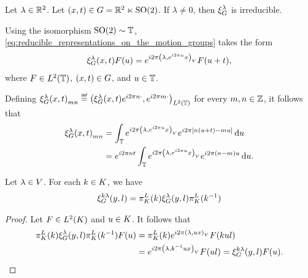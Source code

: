 \begin{example}
    Let $\lambda \in \mathbb{R}^2$.
    Let $(x, t) \in G = \mathbb{R}^2 \ltimes {\mathrm{SO} (2)}$.
    If $\lambda \neq 0$, then $\xi^{\lambda}_{G}$ is irreducible.

    Using the isomorphism ${\mathrm{SO} (2)} \sim \mathbb{T}$,
    \eqref{eq:reducible_representations_on_the_motion_groups} takes the form
    \begin{align*}
        \xi^{\lambda}_{G}(x, t) F(u)
        = e^{i 2 \pi {\left(\lambda, e^{i2 \pi u} x\right)_{V}}} F(u + t),
    \end{align*}
    where $F \in {L^{2} (\mathbb{T})}$, $(x, t) \in G$, and $u \in \mathbb{T}$.

    Defining ${\Rep\lambda(x, t)}_{m n} \defeq \ip[\Lebesgue{2}\T]{\Rep\lambda(x, t) \e^{\i \turn n \dummy}}{\e^{\i \turn m \dummy}}$ for every $m, n \in \mathbb{Z}$,
    it follows that
    \begin{align*}
        {\xi^{\lambda}_{G}(x, t)}_{m n}
        &= \int_{\mathbb{T}} e^{i 2 \pi {\left(\lambda, e^{i2 \pi u} x\right)_{V}}} e^{i 2 \pi [n (u + t) - m u]} \,\mathrm{d} u\\
        &= e^{i 2 \pi n t} \int_{\mathbb{T}} e^{i 2 \pi {\left(\lambda, e^{i2 \pi u} x\right)_{V}}} e^{i 2 \pi (n - m)u} \,\mathrm{d} u.
    \end{align*}
\end{example}

\begin{lemma}
    Let $\lambda \in V$.
    For each $k \in K$, we have
    \begin{align*}
        \xi^{k \lambda}_{G}(y, l) = \pi^L_{K}(k) \xi^{\lambda}_{G}(y, l) \pi^L_{K}(k^{-1})
    \end{align*}
\end{lemma}
\begin{proof}
    Let $F \in {L^{2} (K)}$ and $u \in K$.
    It follows that
    \begin{align*}
        \pi^L_{K}(k) \xi^{\lambda}_{G}(y, l) \pi^L_{K}(k^{-1}) F(u)
        &= \pi^L_{K}(k) e^{i 2 \pi {\left(\lambda, u x\right)_{V}}} F(k u l)\\
        &= e^{i 2 \pi {\left(\lambda, k^{-1} u x\right)_{V}}} F(u l)
        = \xi^{k \lambda}_{G}(y, l) F(u).
    \end{align*}
\end{proof}


